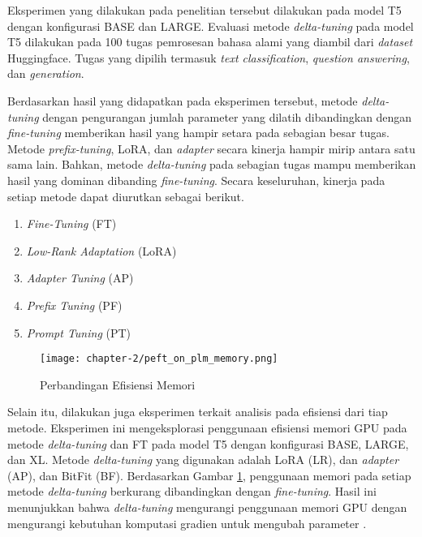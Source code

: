 Eksperimen yang dilakukan pada penelitian tersebut dilakukan pada model T5 dengan konfigurasi BASE dan LARGE. Evaluasi metode \textit{delta-tuning} pada model T5 dilakukan pada 100 tugas pemrosesan bahasa alami yang diambil dari \textit{dataset} Huggingface. Tugas yang dipilih termasuk \textit{text classification}, \textit{question answering}, dan \textit{generation}.

Berdasarkan hasil yang didapatkan pada eksperimen tersebut, metode \textit{delta-tuning} dengan pengurangan jumlah parameter yang dilatih dibandingkan dengan \textit{fine-tuning} memberikan hasil yang hampir setara pada sebagian besar tugas. Metode \textit{prefix-tuning}, LoRA, dan \textit{adapter} secara kinerja hampir mirip antara satu sama lain. Bahkan, metode \textit{delta-tuning} pada sebagian tugas mampu memberikan hasil yang dominan dibanding \textit{fine-tuning}. Secara keseluruhan, kinerja pada setiap metode dapat diurutkan sebagai berikut.

\begin{enumerate}
    \item \textit{Fine-Tuning} (FT)
    \item \textit{Low-Rank Adaptation} (LoRA)
    \item \textit{Adapter Tuning} (AP)
    \item \textit{Prefix Tuning} (PF)
    \item \textit{Prompt Tuning} (PT)
\end{enumerate}

\begin{figure}[ht]
    \centering
    \texttt{[image: chapter-2/peft\_on\_plm\_memory.png]}
    \caption{Perbandingan Efisiensi Memori \parencite{peft_on_plm}}
    \label{fig:peft_on_plm_memory}
\end{figure}

Selain itu, dilakukan juga eksperimen terkait analisis pada efisiensi dari tiap metode. Eksperimen ini mengeksplorasi penggunaan efisiensi memori GPU pada metode \textit{delta-tuning} dan FT pada model T5 dengan konfigurasi BASE, LARGE, dan XL. Metode \textit{delta-tuning} yang digunakan adalah LoRA (LR), dan \textit{adapter} (AP), dan BitFit (BF). Berdasarkan Gambar \ref{fig:peft_on_plm_memory}, penggunaan memori pada setiap metode \textit{delta-tuning} berkurang dibandingkan dengan \textit{fine-tuning}. Hasil ini menunjukkan bahwa \textit{delta-tuning} mengurangi penggunaan memori GPU dengan mengurangi kebutuhan komputasi gradien untuk mengubah parameter \parencite{peft_on_plm}.

